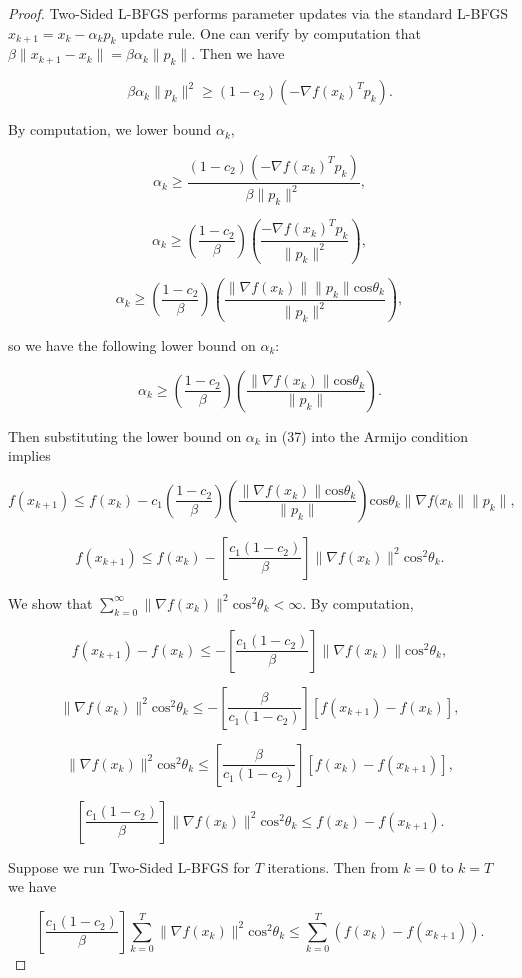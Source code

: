 \documentclass[twoside,11pt]{article}
\begin{document}
\begin{proof}
\noindent
Two-Sided L-BFGS performs parameter updates via the standard L-BFGS $x_{k+1} = x_k - \alpha_k p_k$ update rule. One can verify by computation that $\beta \|x_{k+1} - x_k\| = \beta \alpha_k \|p_k\|$. Then we have

\[
\beta \alpha_k \|p_k\|^2 \geq (1-c_2)(-\nabla f(x_k)^T p_k).
\]

\noindent
By computation, we lower bound $\alpha_k$,

\[
\alpha_k \geq \frac{(1-c_2)(-\nabla f(x_k)^T p_k)}{\beta \|p_k\|^2},
\]

\[
\alpha_k \geq (\frac{1-c_2}{\beta})(\frac{-\nabla f(x_k)^T p_k}{\|p_k \|^2}),
\]

\[
\alpha_k \geq (\frac{1-c_2}{\beta})(\frac{\|\nabla f(x_k)\| \|p_k\| \text{cos}\theta_k}{\|p_k\|^2}),
\]

\noindent
so we have the following lower bound on $\alpha_k$:

\begin{equation}
\alpha_k \geq (\frac{1-c_2}{\beta})(\frac{\| \nabla f(x_k)\| \text{cos}\theta_k}{\|p_k\|}).
\end{equation}

\noindent
Then substituting the lower bound on $\alpha_k$ in (37) into the Armijo condition implies 

\[
f(x_{k+1}) \leq f(x_k) - c_1(\frac{1-c_2}{\beta})(\frac{\|\nabla f(x_k)\| \text{cos}\theta_k}{\|p_k\|})\text{cos}\theta_k \|\nabla f(x_k\| \|p_k\|,
\]

\[
f(x_{k+1}) \leq f(x_k) - [\frac{c_1(1-c_2)}{\beta}]\| \nabla f(x_k)\|^2 \text{cos}^2\theta_k.
\]

\noindent
We show that $\sum_{k=0}^{\infty} \|\nabla f(x_k)\|^2 \text{cos}^2\theta_k < \infty$. By computation,

\[
f(x_{k+1}) - f(x_k) \leq -[\frac{c_1(1-c_2)}{\beta}]\| \nabla f(x_k) \| \text{cos}^2\theta_k,
\]

\[
\|\nabla f(x_k)\|^2 \text{cos}^2\theta_k \leq - [\frac{\beta}{c_1(1-c_2)}][f(x_{k+1}) - f(x_k)],
\]

\[
\|\nabla f(x_k)\|^2 \text{cos}^2\theta_k \leq [\frac{\beta}{c_1(1-c_2)}][f(x_k) - f(x_{k+1})],
\]

\[
[\frac{c_1(1-c_2)}{\beta}]\|\nabla f(x_k)\|^2 \text{cos}^2\theta_k \leq f(x_k) - f(x_{k+1}).
\]

\noindent
Suppose we run Two-Sided L-BFGS for $T$ iterations. Then from $k=0$ to $k=T$ we have

\[
[\frac{c_1(1-c_2)}{\beta}]\sum_{k=0}^{T}\|\nabla f(x_k)\|^2 \text{cos}^2\theta_k \leq \sum_{k=0}^{T}(f(x_k) - f(x_{k+1})).
\]


\end{proof}
\end{document}
